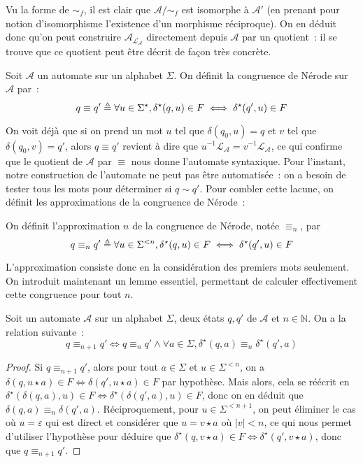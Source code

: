 Vu la forme de $\sim_f$, il est clair que $\mathcal A/{\sim_f}$ est isomorphe à
$\mathcal A'$ (en prenant pour notion d'isomorphisme l'existence d'un morphisme
réciproque). On en déduit donc qu'on peut construire
$\mathcal A_{\mathcal L_\mathcal A}$ directement depuis $\mathcal A$ par un
quotient~: il se trouve que ce quotient peut être décrit de façon très concrète.

\begin{definition}
  Soit $\mathcal A$ un automate sur un alphabet $\Sigma$. On définit la
  congruence de Nérode sur $\mathcal A$ par~:
  \[q \equiv q' \triangleq \forall u \in \Sigma^\star,
  \delta^\star(q,u) \in F \iff \delta^\star(q',u) \in F\]
\end{definition}

On voit déjà que si on prend un mot $u$ tel que $\delta(q_0,u) = q$ et $v$ tel
que $\delta(q_0,v) = q'$, alors $q \equiv q'$ revient à dire que
$u^{-1}\mathcal L_\mathcal A = v^{-1}\mathcal L_\mathcal A$, ce qui confirme que
le quotient de $\mathcal A$ par $\equiv$ nous donne l'automate syntaxique. Pour
l'instant, notre construction de l'automate ne peut pas être automatisée~: on a
besoin de tester tous les mots pour déterminer si $q\sim q'$. Pour combler
cette lacune, on définit les approximations de la congruence de Nérode~:

\begin{definition}
  On définit l'approximation $n$ de la congruence de Nérode, notée $\equiv_n$,
  par
  \[q\equiv_n q' \triangleq \forall u \in \Sigma^{<n}, \delta^\star(q,u)\in F \iff
  \delta^\star(q',u) \in F\]
\end{definition}

L'approximation consiste donc en la considération des premiers mots seulement.
On introduit maintenant un lemme essentiel, permettant de calculer effectivement
cette congruence pour tout $n$.

\begin{lemma}\label{lem.nerode.succ}
  Soit un automate $\mathcal A$ sur un alphabet $\Sigma$, deux états $q,q'$ de
  $\mathcal A$ et $n \in \mathbb N$. On a la relation suivante~:
  \[q \equiv_{n+1} q' \iff q\equiv_n q' \land \forall a \in \Sigma,
  \delta^\star(q,a)\equiv_n \delta^\star(q',a)\]
\end{lemma}

\begin{proof}
  Si $q\equiv_{n+1} q'$, alors pour tout $a\in \Sigma$ et $u \in \Sigma^{<n}$,
  on a $\delta(q,u\star a) \in F \iff \delta(q',u\star a) \in F$ par hypothèse.
  Mais alors, cela se réécrit en
  $\delta^\star(\delta(q,a),u)\in F \iff \delta^\star(\delta(q',a),u)\in F$, donc
  on en déduit que $\delta(q,a)\equiv_n \delta(q',a)$. Réciproquement, pour
  $u \in \Sigma^{< n + 1}$, on peut éliminer le cas où $u = \varepsilon$ qui est
  direct et considérer que $u = v\star a$ où $|v| < n$, ce qui nous permet
  d'utiliser l'hypothèse pour déduire que
  $\delta^\star(q,v\star a)\in F \iff \delta^\star(q',v\star a)$, donc que
  $q\equiv_{n+1} q'$.
\end{proof}

